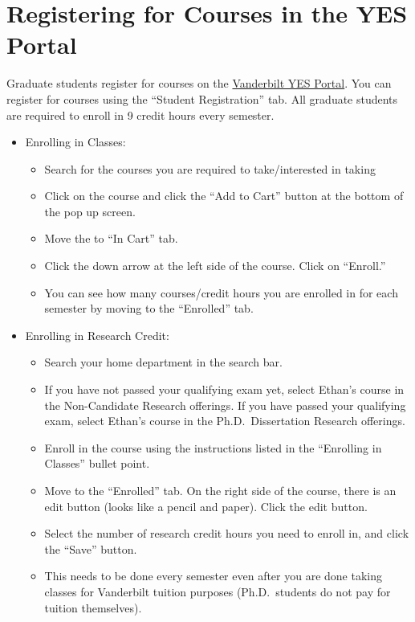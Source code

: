 \documentclass[
]{book}
\providecommand{\tightlist}{%
  \setlength{\itemsep}{0pt}\setlength{\parskip}{0pt}}
\begin{document}
\hypertarget{registering-for-courses-in-the-yes-portal}{%
\section{Registering for Courses in the YES Portal}\label{registering-for-courses-in-the-yes-portal}}

Graduate students register for courses on the \href{http://yes.vanderbilt.edu/}{Vanderbilt YES Portal}. You can register for courses using the ``Student Registration'' tab. All graduate students are required to enroll in 9 credit hours every semester.

\begin{itemize}
\tightlist
\item
  Enrolling in Classes:

  \begin{itemize}
  \tightlist
  \item
    Search for the courses you are required to take/interested in taking
  \item
    Click on the course and click the ``Add to Cart'' button at the bottom of the pop up screen.
  \item
    Move the to ``In Cart'' tab.
  \item
    Click the down arrow at the left side of the course. Click on ``Enroll.''
  \item
    You can see how many courses/credit hours you are enrolled in for each semester by moving to the ``Enrolled'' tab.
  \end{itemize}
\item
  Enrolling in Research Credit:

  \begin{itemize}
  \tightlist
  \item
    Search your home department in the search bar.
  \item
    If you have not passed your qualifying exam yet, select Ethan's course in the Non-Candidate Research offerings. If you have passed your qualifying exam, select Ethan's course in the Ph.D.~Dissertation Research offerings.
  \item
    Enroll in the course using the instructions listed in the ``Enrolling in Classes'' bullet point.
  \item
    Move to the ``Enrolled'' tab. On the right side of the course, there is an edit button (looks like a pencil and paper). Click the edit button.
  \item
    Select the number of research credit hours you need to enroll in, and click the ``Save'' button.
  \item
    This needs to be done every semester even after you are done taking classes for Vanderbilt tuition purposes (Ph.D.~students do not pay for tuition themselves).
  \end{itemize}
\end{itemize}
\end{document}
